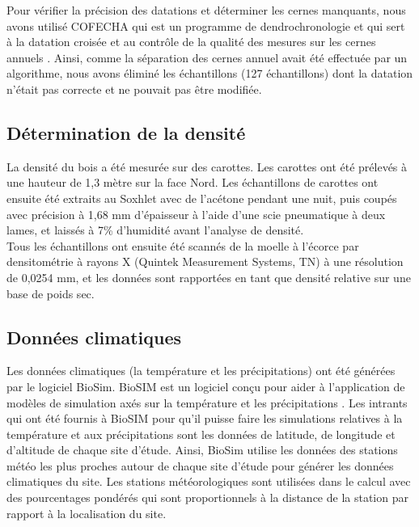 \documentclass[a4paper,12pt]{report}
\begin{document}
Pour vérifier la précision des datations et déterminer les cernes manquants, nous avons utilisé COFECHA qui est un programme de dendrochronologie et qui sert à la datation croisée et au contrôle de la qualité des mesures sur les cernes annuels \citep{HOLMES1983}. Ainsi, comme la séparation des cernes annuel avait été effectuée par un algorithme, nous avons éliminé les échantillons (127 échantillons) dont la datation n'était pas correcte et ne pouvait pas être modifiée. %

\subsection*{Détermination de la densité}\label{densité}
La densité du bois a été mesurée sur des carottes. Les carottes ont été prélevés à une hauteur de 1,3 mètre sur la face Nord. Les échantillons de carottes ont ensuite été extraits au Soxhlet avec de l'acétone pendant une nuit, puis coupés avec précision à 1,68 mm d'épaisseur à l'aide d'une scie pneumatique à deux lames, et laissés à 7\% d'humidité avant l'analyse de densité.\\
 
Tous les échantillons ont ensuite été scannés de la moelle à l'écorce par densitométrie à rayons X (Quintek Measurement Systems, TN) à une résolution de 0,0254 mm, et les données sont rapportées en tant que densité relative sur une base de poids sec. %


\subsection*{Données climatiques}
Les données climatiques (la température et les précipitations) ont été générées par le logiciel BioSim. BioSIM est un logiciel conçu pour aider à l'application de modèles de simulation axés sur la température et les précipitations \citep{Regniere2014}. Les intrants qui ont été fournis à BioSIM pour qu'il puisse faire les simulations relatives à la température et aux précipitations sont les données de latitude, de longitude et d'altitude de chaque site d'étude. Ainsi, BioSim utilise les données des stations météo les plus proches autour de chaque site d'étude pour générer les données climatiques du site. Les stations météorologiques sont utilisées dans le calcul avec des pourcentages pondérés qui sont proportionnels à la distance de la station par rapport à la localisation du site.\\ 
\end{document}
